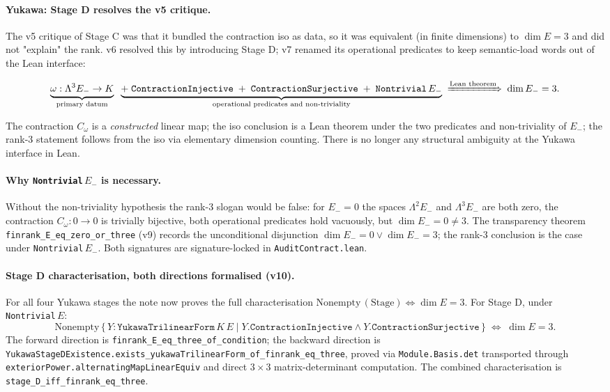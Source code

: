 \documentclass[11pt,a4paper]{article}
\begin{document}
\paragraph{Yukawa: Stage D resolves the v5 critique.}
The v5 critique of Stage C was that it bundled the contraction
iso as data, so it was equivalent (in finite dimensions) to
$\dim E = 3$ and did not "explain" the rank. v6 resolved this
by introducing Stage D; v7 renamed its operational predicates
to keep semantic-load words out of the Lean interface:

\[
\underbrace{\omega : \Lambda^3 E_- \to K}_{\text{primary datum}}
\;\;
\underbrace{+\;\texttt{ContractionInjective}\;+\;\texttt{ContractionSurjective}\;+\;\texttt{Nontrivial}\,E_-}_{\text{operational predicates and non-triviality}}
\;\xRightarrow{\text{Lean theorem}}\;
\dim E_- = 3.
\]

The contraction $C_\omega$ is a \emph{constructed} linear map;
the iso conclusion is a Lean theorem under the two predicates
and non-triviality of $E_-$; the rank-3 statement follows from
the iso via elementary dimension counting. There is no longer
any structural ambiguity at the Yukawa interface in Lean.

\paragraph{Why \texttt{Nontrivial}\,$E_-$ is necessary.}
Without the non-triviality hypothesis the rank-3 slogan would be
false: for $E_- = 0$ the spaces $\Lambda^2 E_-$ and $\Lambda^3
E_-$ are both zero, the contraction $C_\omega : 0 \to 0$ is
trivially bijective, both operational predicates hold vacuously,
but $\dim E_- = 0 \ne 3$. The transparency theorem
\texttt{finrank\_E\_eq\_zero\_or\_three} (v9) records the
unconditional disjunction $\dim E_- = 0 \lor \dim E_- = 3$;
the rank-3 conclusion is the case under
\texttt{Nontrivial}\,$E_-$. Both signatures are signature-locked
in \texttt{AuditContract.lean}.

\paragraph{Stage D characterisation, both directions formalised (v10).}
For all four Yukawa stages the note now proves the full
characterisation
$\text{Nonempty}\,(\text{Stage}) \iff \dim E = 3$.
For Stage D, under \texttt{Nontrivial}\,$E$:
\[
\text{Nonempty}\,\bigl\{\,Y : \texttt{YukawaTrilinearForm}\,K\,E
  \;\big|\; Y.\texttt{ContractionInjective}
  \land Y.\texttt{ContractionSurjective}\,\bigr\}
\;\iff\;
\dim E = 3.
\]
The forward direction is
\texttt{finrank\_E\_eq\_three\_of\_condition}; the backward
direction is \texttt{YukawaStageDExistence.exists\_yukawaTrilinearForm\_of\_finrank\_eq\_three},
proved via \texttt{Module.Basis.det} transported through
\texttt{exteriorPower.alternatingMapLinearEquiv} and direct
$3\times 3$ matrix-determinant computation. The combined
characterisation is \texttt{stage\_D\_iff\_finrank\_eq\_three}.
\end{document}
